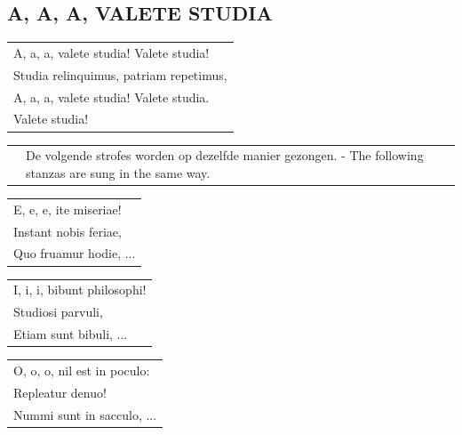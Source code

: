 \documentclass[a4paper, 14pt]{extarticle}
\begin{document}
\subsection*{A, A, A, VALETE STUDIA}
\begin{flushleft}
\begin{tabularx}{\textwidth} {
    >{\raggedright\arraybackslash}X}
A, a, a, valete studia! Valete studia!\\
Studia relinquimus, patriam repetimus,\\
A, a, a, valete studia! Valete studia.\\
Valete studia!\\
\end{tabularx}
\end{flushleft}
\begin{flushleft}
\begin{tabularx}{\textwidth} {
    c >{\raggedright\arraybackslash}X }
\hspace{5mm} & {\small De volgende strofes worden op dezelfde manier gezongen. - The following stanzas are sung in the same way.}\\
\end{tabularx}
\end{flushleft}
\begin{flushleft}
\begin{tabularx}{\textwidth} {
    >{\raggedright\arraybackslash}X}
E, e, e, ite miseriae!\\
Instant nobis feriae,\\
Quo fruamur hodie, ...\\
\end{tabularx}
\end{flushleft}
\begin{flushleft}
\begin{tabularx}{\textwidth} {
    >{\raggedright\arraybackslash}X}
I, i, i, bibunt philosophi!\\
Studiosi parvuli,\\
Etiam sunt bibuli, ...\\
\end{tabularx}
\end{flushleft}
\begin{flushleft}
\begin{tabularx}{\textwidth} {
    >{\raggedright\arraybackslash}X}
O, o, o, nil est in poculo:\\
Repleatur denuo!\\
Nummi sunt in sacculo, ...\\
\end{tabularx}
\end{flushleft}
\end{document}
